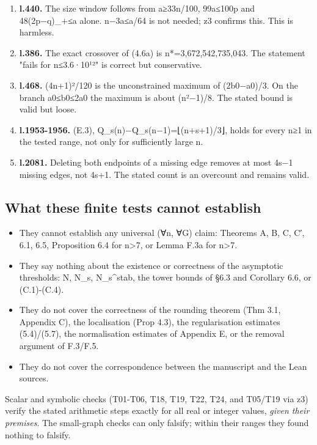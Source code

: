 \documentclass[
]{article}
\providecommand{\tightlist}{%
  \setlength{\itemsep}{0pt}\setlength{\parskip}{0pt}}
\begin{document}
\begin{enumerate}
\def\labelenumi{\arabic{enumi}.}
\tightlist
\item
  \textbf{l.440.} The size window follows from a≥33n/100, 99a≤100p and
  48(2p−q)\_+≤a alone. \textbar n−3a\textbar≤a/64 is not needed; z3
  confirms this. This is harmless.
\item
  \textbf{l.386.} The exact crossover of (4.6a) is n*=3,672,542,735,043.
  The statement "fails for n≤3.6·10¹²" is correct but conservative.
\item
  \textbf{l.468.} (4n+1)²/120 is the unconstrained maximum of
  (2b0−a0)/3. On the branch a0≤b0≤2a0 the maximum is about (n²−1)/8. The
  stated bound is valid but loose.
\item
  \textbf{l.1953-1956.} (E.3), Q\_s(n)−Q\_s(n−1)=⌊(n+s+1)/3⌋, holds for
  every n≥1 in the tested range, not only for sufficiently large n.
\item
  \textbf{l.2081.} Deleting both endpoints of a missing edge removes at
  most 4s−1 missing edges, not 4s+1. The stated count is an overcount
  and remains valid.
\end{enumerate}

\subsection{What these finite tests cannot
establish}\label{what-these-finite-tests-cannot-establish}

\begin{itemize}
\tightlist
\item
  They cannot establish any universal (∀n, ∀G) claim: Theorems A, B, C,
  C′, 6.1, 6.5, Proposition 6.4 for n\textgreater7, or Lemma F.3a for
  n\textgreater7.
\item
  They say nothing about the existence or correctness of the asymptotic
  thresholds: N, N\_s, N\_s\^{}stab, the tower bounds of §6.3 and
  Corollary 6.6, or (C.1)-(C.4).
\item
  They do not cover the correctness of the rounding theorem (Thm 3.1,
  Appendix C), the localisation (Prop 4.3), the regularisation estimates
  (5.4)/(5.7), the normalisation estimates of Appendix E, or the removal
  argument of F.3/F.5.
\item
  They do not cover the correspondence between the manuscript and the
  Lean sources.
\end{itemize}

Scalar and symbolic checks (T01-T06, T18, T19, T22, T24, and T05/T19 via
z3) verify the stated arithmetic steps exactly for all real or integer
values, \emph{given their premises}. The small-graph checks can only
falsify; within their ranges they found nothing to falsify.
\end{document}
